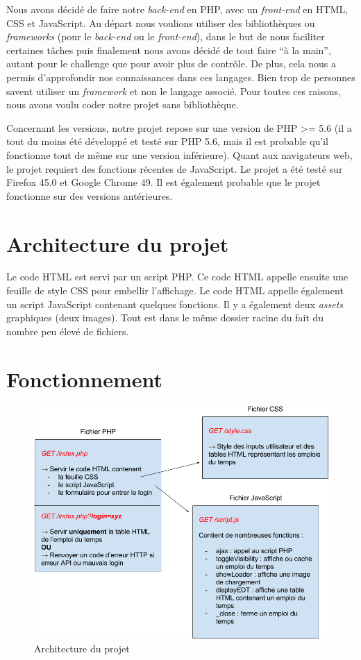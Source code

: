 Nous avons décidé de faire notre \textit{back-end} en PHP, avec un \textit{front-end} en HTML, CSS et JavaScript. Au départ nous voulions utiliser des bibliothèques ou \textit{frameworks} (pour le \textit{back-end} ou le \textit{front-end}), dans le but de nous faciliter certaines tâches puis finalement nous avons décidé de tout faire ``à la main'', autant pour le challenge que pour avoir plus de contrôle. De plus, cela nous a permis d'approfondir nos connaissances dans ces langages. Bien trop de personnes savent utiliser un \textit{framework} et non le langage associé. Pour toutes ces raisons, nous avons voulu coder notre projet sans bibliothèque.

\medskip

Concernant les versions, notre projet repose sur une version de PHP >= 5.6 (il a tout du moins été développé et testé sur PHP 5.6, mais il est probable qu'il fonctionne tout de même sur une version inférieure). Quant aux navigateurs web, le projet requiert des fonctions récentes de JavaScript. Le projet a été testé sur Firefox 45.0 et Google Chrome 49. Il est également probable que le projet fonctionne sur des versions antérieures.

\section{Architecture du projet}

Le code HTML est servi par un script PHP. Ce code HTML appelle ensuite une feuille de style CSS pour embellir l'affichage. Le code HTML appelle également un script JavaScript contenant quelques fonctions. Il y a également deux \textit{assets} graphiques (deux images). Tout est dans le même dossier racine du fait du nombre peu élevé de fichiers.

\section{Fonctionnement}

\begin{figure}[h]
    \centering\includegraphics[width=1.00\textwidth]{images/arch.png}
    \caption{Architecture du projet}
\end{figure}

